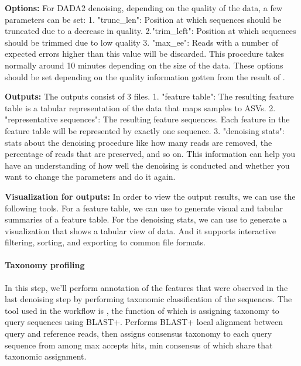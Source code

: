             \textbf{Options:}
                For DADA2 denoising, depending on the quality of the data, a few parameters can be set: 1. "trunc\_len": Position at which sequences should be truncated due to a decrease in quality. 2."trim\_left": Position at which sequences should be trimmed due to low quality  3. "max\_ee": Reads with a number of expected errors higher than this value will be discarded. This procedure takes normally around 10 minutes depending on the size of the data. These options should be set depending on the quality information gotten from the result of . 
            
            \textbf{Outputs:}
                The outputs consist of 3 files. 1. "feature table": The resulting feature table is a tabular representation of the data that maps samples to ASVs.  2. "representative sequences": The resulting feature sequences. Each feature in the feature table will be represented by exactly one sequence. 3. "denoising stats": stats about the denoising procedure like how many reads are removed, the percentage of reads that are preserved, and so on. This information can help you have an understanding of how well the denoising is conducted and whether you want to change the parameters and do it again.
    
            \textbf{Visualization for outputs:}
                In order to view the output results, we can use the following tools. For a feature table, we can use  to generate visual and tabular summaries of a feature table. For the denoising stats, we can use  to generate a visualization that shows a tabular view of data. And it supports interactive filtering, sorting, and exporting to common file formats.


        \paragraph*{Taxonomy profiling}
            In this step, we’ll perform annotation of the features that were observed in the last denoising step by performing taxonomic classification of the sequences. The tool used in the workflow is , the function of which is assigning taxonomy to query sequences using BLAST+. Performs BLAST+ local alignment between query and reference reads, then assigns consensus taxonomy to each query sequence from among max accepts hits, min consensus of which share that taxonomic assignment.
    
